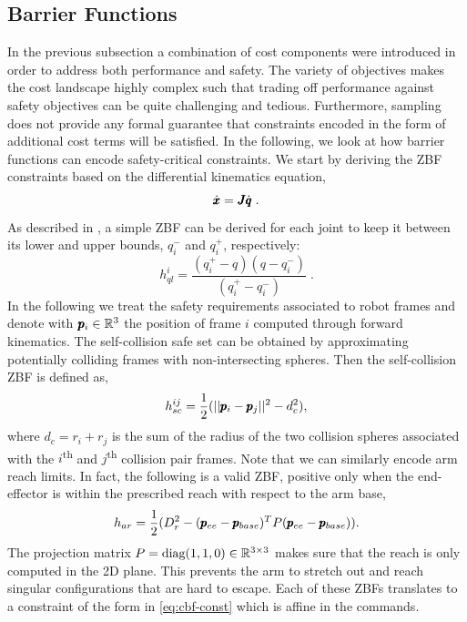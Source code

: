 
\subsection{Barrier Functions}
In the previous subsection a combination of cost components were introduced in order to address both performance and safety. The variety of objectives makes the cost landscape highly complex such that trading off performance against safety objectives can be quite challenging and tedious. Furthermore, sampling does not provide any formal guarantee that constraints encoded in the form of additional cost terms will be satisfied. In the following, we look at how barrier functions can encode safety-critical constraints. We start by deriving the ZBF constraints based on the differential kinematics equation,
\begin{equation}
    \dot{\pmb{x}} = \pmb{J} \dot{\pmb{q}}\;.
\end{equation}
As described in \cite{benzi2021optimization}, a simple ZBF can be derived for each joint to keep it between its lower and upper bounds, $q_i^-$ and $q_i^+$, respectively:
\begin{equation}
h_{ql}^i = \frac{(q_i^+ - q)(q - q_i^-)}{(q_i^+ - q_i^-)}\;.
\end{equation}
In the following we treat the safety requirements associated to robot frames and denote with $\pmb{p}_{i} \in \mathbb{R}^{3}$ the position of frame $i$ computed through forward kinematics.  
The self-collision safe set can be obtained by approximating potentially colliding frames with non-intersecting spheres. Then the self-collision ZBF is defined as,
\begin{equation}
    h_{sc}^{ij} = \frac{1}{2}(||\pmb{p}_i - \pmb{p}_j||^2 - d_c^2),
\end{equation}
where $d_c = r_i + r_j$ is the sum of the radius of the two collision spheres associated with the $i$\textsuperscript{th}  and $j$\textsuperscript{th} collision pair frames. Note that we can similarly encode arm reach limits. In fact, the following is a valid ZBF, positive only when the end-effector is within the prescribed reach with respect to the arm base,
\begin{equation}
    h_{ar} = \frac{1}{2}(D_r^2 - (\pmb{p}_{ee} - \pmb{p}_{base})^T P (\pmb{p}_{ee} - \pmb{p}_{base}) ).
\end{equation}
The projection matrix $P = \text{diag}(1, 1, 0) \in \mathbb{R}^{3 \times 3}$ makes sure that the reach is only computed in the 2D plane. This prevents the arm to stretch out and reach singular configurations that are hard to escape. Each of these ZBFs translates to a constraint of the form in \eqref{eq:cbf-const} which is affine in the commands. 

